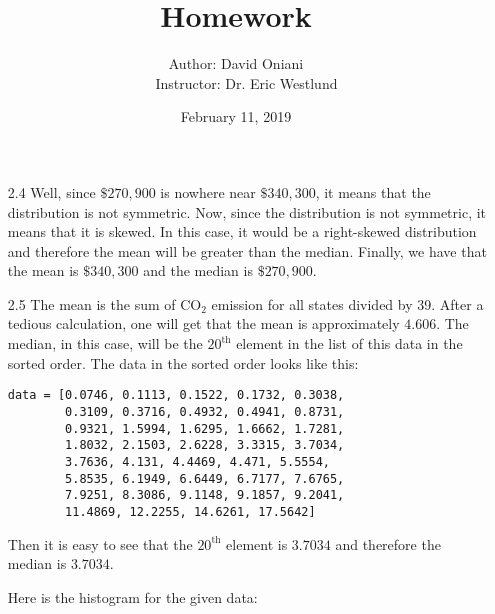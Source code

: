 \documentclass[11pt, a4paper]{article}
\title{\bf{Homework \textnumero 2}}
\author{Author: David Oniani
\\
\ \ \ Instructor: Dr. Eric Westlund}
\date{February 11, 2019}
\begin{document}
\maketitle
\begin{itemize}
\item[2.4]
Well, since $\$270, 900$ is nowhere near $\$340, 300$, it means that the distribution
is not symmetric. Now, since the distribution is not symmetric, it means that it is skewed.
In this case, it would be a right-skewed distribution and therefore the mean will
be greater than the median. Finally, we have that the mean is $\$340, 300$ and the median is $\$270, 900$.

\item[]

\item[2.5]
The mean is the sum of CO$_2$ emission for all states divided by 39. After a tedious
calculation, one will get that the mean is approximately $4.606$. The median, in this case,
will be the $20^{\text{th}}$ element in the list of this data in the sorted order.
The data in the sorted order looks like this:

\begin{center}
\begin{verbatim}
data = [0.0746, 0.1113, 0.1522, 0.1732, 0.3038,
        0.3109, 0.3716, 0.4932, 0.4941, 0.8731,
        0.9321, 1.5994, 1.6295, 1.6662, 1.7281,
        1.8032, 2.1503, 2.6228, 3.3315, 3.7034,
        3.7636, 4.131, 4.4469, 4.471, 5.5554,
        5.8535, 6.1949, 6.6449, 6.7177, 7.6765,
        7.9251, 8.3086, 9.1148, 9.1857, 9.2041,
        11.4869, 12.2255, 14.6261, 17.5642]
\end{verbatim}
\end{center}

Then it is easy to see that the $20^{\text{th}}$ element is $3.7034$
and therefore the median is $3.7034$.

Here is the histogram for the given data:
\begin{center}
\end{center}


\end{itemize}
\end{document}
